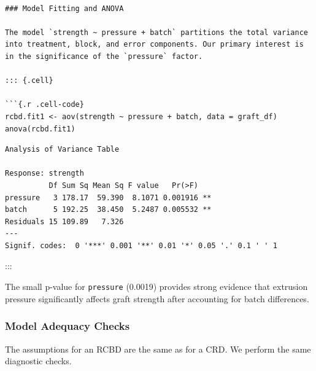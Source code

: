 \documentclass[
  letterpaper,
]{scrbook}
\begin{document}
\begin{verbatim}

### Model Fitting and ANOVA

The model `strength ~ pressure + batch` partitions the total variance into treatment, block, and error components. Our primary interest is in the significance of the `pressure` factor.

::: {.cell}

```{.r .cell-code}
rcbd.fit1 <- aov(strength ~ pressure + batch, data = graft_df)
anova(rcbd.fit1)
\end{verbatim}

\begin{verbatim}
Analysis of Variance Table

Response: strength
          Df Sum Sq Mean Sq F value   Pr(>F)   
pressure   3 178.17  59.390  8.1071 0.001916 **
batch      5 192.25  38.450  5.2487 0.005532 **
Residuals 15 109.89   7.326                    
---
Signif. codes:  0 '***' 0.001 '**' 0.01 '*' 0.05 '.' 0.1 ' ' 1
\end{verbatim}

:::

The small p-value for \texttt{pressure} (0.0019) provides strong
evidence that extrusion pressure significantly affects graft strength
after accounting for batch differences.

\subsubsection{Model Adequacy Checks}\label{model-adequacy-checks}

The assumptions for an RCBD are the same as for a CRD. We perform the
same diagnostic checks.
\end{document}
